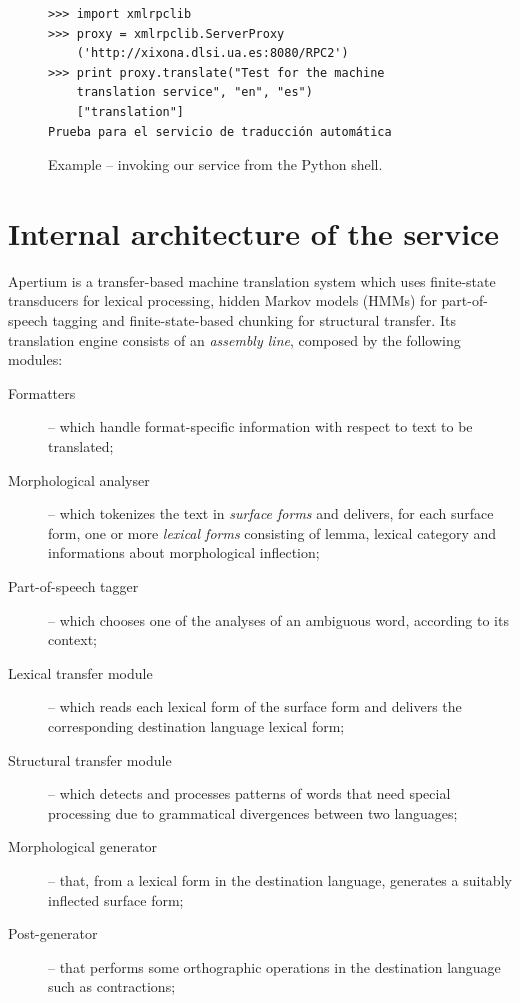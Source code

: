 \documentclass[11pt]{article}
\begin{document}

\begin{figure}
 \begin{Verbatim}[frame=single, fontfamily=courier, fontsize=\scriptsize]
>>> import xmlrpclib
>>> proxy = xmlrpclib.ServerProxy
	('http://xixona.dlsi.ua.es:8080/RPC2')
>>> print proxy.translate("Test for the machine 
	translation service", "en", "es")
	["translation"]
Prueba para el servicio de traducción automática
 \end{Verbatim}
 \caption{Example -- invoking our service from the Python shell.}
 \label{fig:pythoninv}
\end{figure}

\section{Internal architecture of the service}

Apertium is a transfer-based machine translation system which uses finite-state transducers for lexical processing, hidden Markov models (HMMs) for part-of-speech tagging and finite-state-based chunking for structural transfer. Its translation engine consists of an \emph{assembly line}, composed by the following modules:

\begin{description}
 \item[Formatters] -- which handle format-specific information with respect to text to be translated;
 \item[Morphological analyser] -- which tokenizes the text in \emph{surface forms} and delivers, for each surface form, one or more \emph{lexical forms} consisting of lemma, lexical category and informations about morphological inflection;
 \item[Part-of-speech tagger] -- which chooses one of the analyses of an ambiguous word, according to its context;
 \item[Lexical transfer module] -- which reads each lexical form of the surface form and delivers the corresponding destination language lexical form;
 \item[Structural transfer module] -- which detects and processes patterns of words that need special processing due to grammatical divergences between two languages;
 \item[Morphological generator] -- that, from a lexical form in the destination language, generates a suitably inflected surface form;
 \item[Post-generator] -- that performs some orthographic operations in the destination language such as contractions;
\end{description}
\end{document}
